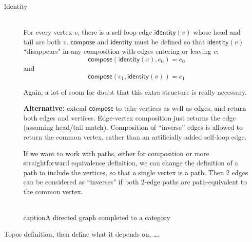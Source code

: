 \documentclass[11pt,openany]{article}
\begin{document}
\begin{description}
\item[Identity]\mbox{}\\
For every vertex $v$, there is a self-loop edge 
$\mathsf{identity}(v)$ whose head and tail
are both $v$.
$\mathsf{compose}$ and $\mathsf{identity}$
must be defined so that  $\mathsf{identity}(v)$ 
``disappears" in any composition with edges 
entering or leaving $v$:
\[ \mathsf{compose}(\mathsf{identity}(v),e_0) = e_0 \]
and
\[ \mathsf{compose}(e_1,\mathsf{identity}(v)) = e_1 \]
\par
Again, a lot of room for doubt that this extra structure is really necessary.
\par
\textbf{Alternative:} 
extend $\mathsf{compose}$ to take vertices as well as edges,
and return both edges and vertices.
Edge-vertex composition just returns the edge (assuming head/tail match).
Composition of ``inverse'' edges is allowed to return the common vertex,
rather than an artificially added self-loop edge.
\par
If we want to work with paths, either for composition
or more straightforward equivalence definition,
we can change the definition of a path to include the vertices,
so that a single vertex is a path. 
Then $2$ edges can be considered as ``inverses'' if both
$2$-edge paths are path-equivalent to the common vertex.
\end{description}

\begin{figure}
\centering
{}
\\caption{A directed graph completed to a category}
\label{fig:a-completed-digraph}

\end{figure}

\setcounter{currentlevel}{\value{baseSectionLevel}}
\label{sec:Topos-down}
 
Topos definition, then define what it depends on, \ldots.
 
\setcounter{currentlevel}{\value{baseSectionLevel}}
\label{sec:Fusion}
\end{document}
